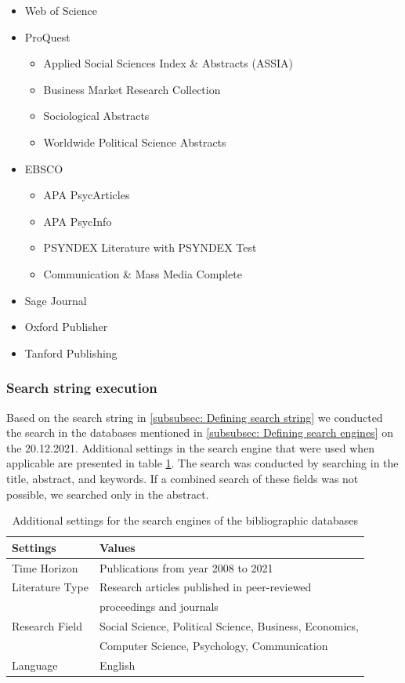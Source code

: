 \begin{itemize}
    \item  Web of Science
    \item ProQuest
    \begin{itemize}
        \item Applied Social Sciences Index \& Abstracts (ASSIA)
        \item Business Market Research Collection
        \item Sociological Abstracts
        \item Worldwide Political Science Abstracts
    \end{itemize}
    \item EBSCO
    \begin{itemize}
        \item APA PsycArticles
        \item APA PsycInfo
        \item PSYNDEX Literature with PSYNDEX Test
        \item Communication \& Mass Media Complete
    \end{itemize}
    \item Sage Journal
    \item Oxford Publisher
    \item Tanford Publishing
\end{itemize}

\subsubsection{Search string execution}

Based on the search string in \ref{subsubsec: Defining search string} we conducted the search in the databases mentioned in \ref{subsubsec: Defining search engines} on the 20.12.2021. Additional settings in the search engine that were used when applicable are presented in table \ref{tab: search settings}. The search was conducted by searching in the title, abstract, and keywords. If a combined search of these fields was not possible, we searched only in the abstract.

\begin{table}
	\centering
	\begin{tabular}{ll}
		\toprule
		Settings & Values \\
		\midrule
		Time Horizon & Publications from year 2008 to 2021 \\ 
		Literature Type & Research articles published in peer-reviewed \\
		& proceedings and journals \\
		Research Field & Social Science, Political Science, Business, Economics, \\
		& Computer Science, Psychology, Communication \\
		Language & English \\
		\bottomrule 
	\end{tabular}
	\label{tab: search settings}
	\caption{Additional settings for the search engines of the bibliographic databases}
\end{table} 

